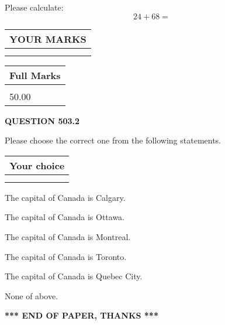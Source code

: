 \documentclass[12pt]{article}
\begin{document}
  
 
Please calculate:
\begin{equation}
24 +  %
68 = \nonumber
\end{equation}
 

 

 
  
\vspace{0.2in}
  
\noindent\begin{tabular}{|l|}
\hline
 YOUR MARKS  \\
\hline
 \\ 
 \\ 
\hline
\end{tabular}
\hspace{0.05in} \begin{tabular}{|l|}
\hline
 Full Marks  \\
\hline
 \\ 
50.00 \\
\hline
\end{tabular}
{\textbf{\Large{QUESTION
503.2 
}}}
  
  
Please choose the correct one from the following statements.
  
  
\noindent\hspace{3.0in} \begin{tabular}{|l|}
\hline
Your choice \\
\hline
 \\ 
 \\ 
\hline
\end{tabular}
  
  
 
 
The capital of Canada is Calgary.
 
 
The capital of Canada is Ottawa.
 
 
The capital of Canada is Montreal.
 
 
The capital of Canada is Toronto.
 
 
The capital of Canada is Quebec City.
 
 
 None of above.
 
 
   
   
 \vspace{0.2in}
 
   
   
   
   
\vspace{1.0in} 
{\textbf{\large{ *** END OF PAPER, THANKS *** }}} 
   
\end{document}
